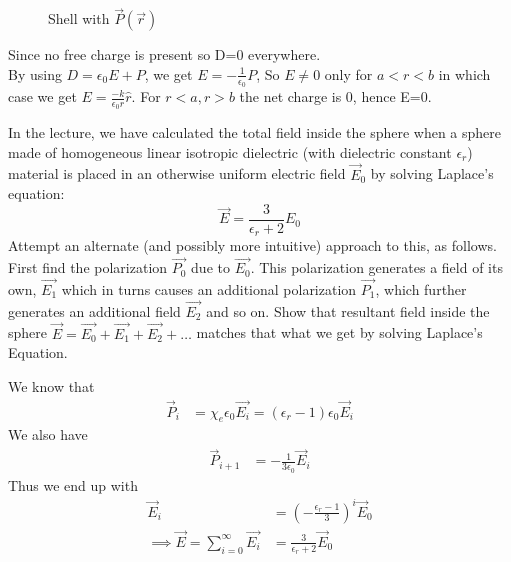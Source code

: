 \documentclass[../main.tex]{subfiles}
\begin{document}
\begin{questions}
\begin{figure}[H]
	\caption{Shell with $\vec{P}(\vec{r})$}
	\label{fig:f1}
\end{figure}


\begin{solution}
Since no free charge is present so D=0 everywhere.\\
By using $D=\epsilon_0E +P$, we get $E=-\frac{1}{\epsilon_0}P$, So $E\neq0$ only for $a<r<b$ in which case we get $E=\frac{-k}{\epsilon_0r}\hat{r}$. For $r<a, r>b$ the net charge is 0, hence E=0.
\end{solution}
	
\question In the lecture, we have calculated the total field inside the sphere when a sphere made of homogeneous linear isotropic dielectric (with dielectric constant $\epsilon_r$) material is placed in an otherwise uniform electric field $\vec{E}_0$ by solving Laplace's equation:
\begin{equation*}
	\vec{E} = \frac{3}{\epsilon_r + 2}E_0
\end{equation*}
Attempt an alternate (and possibly more intuitive) approach to this, as follows. First find the polarization $\vec{P_0}$ due to $\vec{E_0}$. This polarization generates a field of its own, $\vec{E_1}$ which in turns causes an additional polarization $\vec{P_1}$, which further generates an additional field $\vec{E_2}$ and so on. Show that resultant field inside the sphere $\vec{E} = \vec{E_0} + \vec{E_1} + \vec{E_2} + \dots$ matches that what we get by solving Laplace's Equation.
\begin{solution}
	We know that
	\begin{align}
		\vec{P}_i &= \chi_e\epsilon_0\vec{E_i} = (\epsilon_r-1)\epsilon_0\vec{E}_i
	\end{align}
	We also have
	\begin{align}
		\vec{P}_{i+1} &= -\frac{1}{3\epsilon_0}\vec{E}_i
	\end{align}
	Thus we end up with
	\begin{align}
		\vec{E}_i &= \left(-\frac{\epsilon_r-1}{3}\right)^i\vec{E}_0\\
		\implies \vec{E} = \sum_{i=0}^{\infty} \vec{E_i} &= \frac{3}{\epsilon_r + 2}\vec{E}_0
	\end{align}
\end{solution}


\end{questions}
\end{document}
